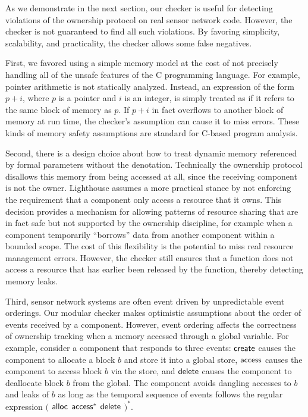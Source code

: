 As we demonstrate in the next section, our checker is useful for detecting
violations of the ownership protocol on real sensor network code.  
%
However, the checker is not guaranteed to find all such violations.  
%
By favoring simplicity, scalability, and practicality, the checker allows some
false negatives.




First, we favored using a simple memory model at the cost of not precisely
handling all of the unsafe features of the C programming language.  
%
For example, pointer arithmetic is not statically analyzed.  
%
Instead, an expression of the form $p+i$, where $p$ is a pointer and $i$ is an
integer, is simply treated as if it refers to the same block of memory as $p$.  
%
If $p+i$ in fact overflows to another block of memory at run time, the
checker's assumption can cause it to miss errors.  
%
These kinds of memory safety assumptions are standard for C-based program
analysis.



Second, there is a design choice about how to treat dynamic memory referenced
by formal parameters without the  denotation.
%
Technically the ownership protocol disallows this memory from being accessed
at all, since the receiving component is not the owner.  
%
Lighthouse assumes a more practical stance by not enforcing the requirement
that a component only access a resource that it owns.
% 
This decision provides a mechanism for allowing patterns of resource sharing
that are in fact safe but not supported by the ownership discipline, for
example when a component temporarily ``borrows'' data from another component
within a bounded scope.
%
The cost of this flexibility is the potential to miss real resource management
errors.
%
However, the checker still ensures that a function does not access a resource
that has earlier been released by the function, thereby detecting memory
leaks.



Third, sensor network systems are often event driven by unpredictable event
orderings.
%
Our modular checker makes optimistic assumptions about the order of events
received by a component.  
%
However, event ordering affects the correctness of ownership tracking when a
memory accessed through a global variable.
%
For example, consider a component that responds to three events: ${\mathsf{create}}$
causes the component to allocate a block $b$ and store it into a global
store, ${\mathsf{access}}$ causes the component to access block $b$ via the store, and
${\mathsf{delete}}$ causes the component to deallocate block $b$ from the global.  
%
The component avoids dangling accesses to $b$ and leaks of $b$ as long as
the temporal sequence of events follows the regular expression $($ ${\mathsf{alloc}}$
${\mathsf{access}}^*$ ${\mathsf{delete}}$ $)^*$.  




